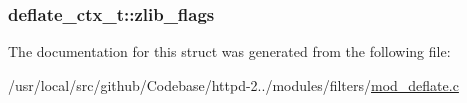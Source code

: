 \subsubsection[{\texorpdfstring{zlib\+\_\+flags}{zlib_flags}}]{ deflate\+\_\+ctx\+\_\+t\+::zlib\+\_\+flags}\hypertarget{structdeflate__ctx__t_a35639fc005830dbcd90cd40d91bbabae}{}\label{structdeflate__ctx__t_a35639fc005830dbcd90cd40d91bbabae}


The documentation for this struct was generated from the following file\+:\begin{DoxyCompactItemize}
\item 
/usr/local/src/github/\+Codebase/httpd-\/2../modules/filters/\hyperlink{mod__deflate_8c}{mod\+\_\+deflate.\+c}\end{DoxyCompactItemize}
